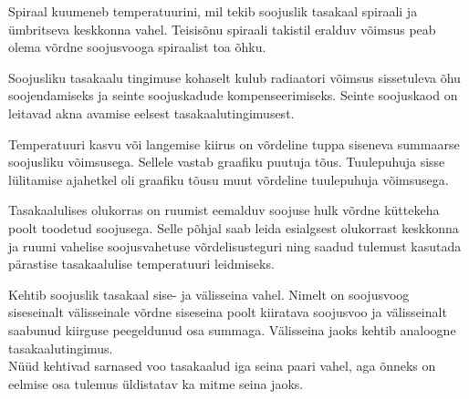 \documentclass[10pt, twoside]{article}
\begin{document}
{%

\hint
Spiraal kuumeneb temperatuurini, mil tekib soojuslik tasakaal spiraali ja ümbritseva keskkonna vahel. Teisisõnu spiraali takistil eralduv võimsus peab olema võrdne soojusvooga spiraalist toa õhku.
\probend
\bigskip


\hint
Soojusliku tasakaalu tingimuse kohaselt kulub radiaatori võimsus sissetuleva õhu soojendamiseks ja seinte soojuskadude kompenseerimiseks. Seinte soojuskaod on leitavad akna avamise eelsest tasakaalutingimusest.
\probend
\bigskip


\hint
Temperatuuri kasvu või langemise kiirus on võrdeline tuppa siseneva summaarse soojusliku võimsusega. Sellele vastab graafiku puutuja tõus. Tuulepuhuja sisse lülitamise ajahetkel oli graafiku tõusu muut võrdeline tuulepuhuja võimsusega.
\probend
\bigskip


\hint
Tasakaalulises olukorras on ruumist eemalduv soojuse hulk võrdne küttekeha poolt toodetud soojusega. Selle põhjal saab leida esialgsest olukorrast keskkonna ja ruumi vahelise soojusvahetuse võrdelisusteguri ning saadud tulemust kasutada pärastise tasakaalulise temperatuuri leidmiseks.
\probend
\bigskip


\hint
\osa Kehtib soojuslik tasakaal sise- ja välisseina vahel. Nimelt on soojusvoog siseseinalt välisseinale võrdne siseseina poolt kiiratava soojusvoo ja välisseinalt saabunud kiirguse peegeldunud osa summaga. Välisseina jaoks kehtib analoogne tasakaalutingimus.\\
\osa Nüüd kehtivad sarnased voo tasakaalud iga seina paari vahel, aga õnneks on eelmise osa tulemus üldistatav ka mitme seina jaoks.
\probend
\bigskip

}
\end{document}

